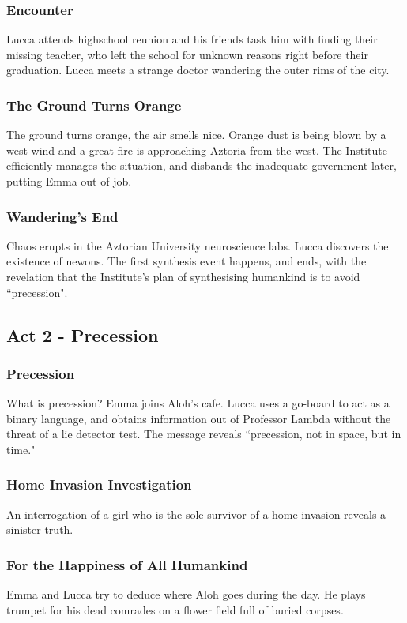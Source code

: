 \documentclass[11pt]{article}
\begin{document}
		\subsubsection{Encounter}
		Lucca attends highschool reunion and his friends task him with finding their missing teacher, who left the school for unknown reasons right before their graduation. 
		Lucca meets a strange doctor wandering the outer rims of the city.
		\subsubsection{The Ground Turns Orange}
		The ground turns orange, the air smells nice.
		Orange dust is being blown by a west wind and a great fire is approaching Aztoria from the west. 
		The Institute efficiently manages the situation, and disbands the inadequate government later, putting Emma out of job.
		\subsubsection{Wandering's End}
		Chaos erupts in the Aztorian University neuroscience labs. 
		Lucca discovers the existence of newons.
		The first synthesis event happens, and ends, with the revelation that the Institute's plan of synthesising humankind is to avoid ``precession".
	\newpage



	\subsection{Act 2 - Precession}
		\subsubsection{Precession}
		What is precession? 
		Emma joins Aloh's cafe.
		Lucca uses a go-board to act as a binary language, and obtains information out of Professor Lambda without the threat of a lie detector test.
		The message reveals ``precession, not in space, but in time."
		\subsubsection{Home Invasion Investigation}
		An interrogation of a girl who is the sole survivor of a home invasion reveals a sinister truth.
		\subsubsection{For the Happiness of All Humankind}
		Emma and Lucca try to deduce where Aloh goes during the day.
		He plays trumpet for his dead comrades on a flower field full of buried corpses.
\end{document}
